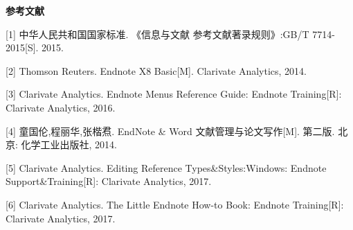\documentclass[12pt,a4paper,UTF8]{ctexart}
\begin{document}
	
	
	\newpage
	\begin{center}
		\textbf{参考文献}
	\end{center}

[1] 中华人民共和国国家标准. 《信息与文献 参考文献著录规则》:GB/T 7714-
2015[S]. 2015.

[2] Thomson Reuters. Endnote X8 Basic[M]. Clarivate Analytics, 2014.

[3] Clarivate Analytics. Endnote Menus Reference Guide: Endnote Training[R]:
Clarivate Analytics, 2016.

[4] 童国伦,程丽华,张楷焄. EndNote \& Word 文献管理与论文写作[M]. 第二版. 
北京: 化学工业出版社, 2014.

[5] Clarivate Analytics. Editing Reference Types\&Styles:Windows: Endnote 
Support\&Training[R]: Clarivate Analytics, 2017.

[6] Clarivate Analytics. The Little Endnote How-to Book: Endnote Training[R]:
Clarivate Analytics, 2017.
	
\end{document}
